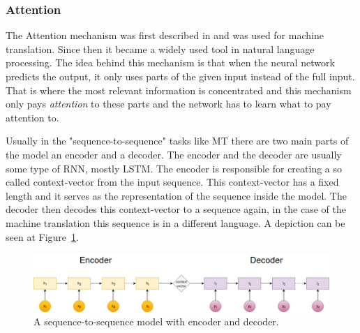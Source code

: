 \subsubsection{Attention}
The Attention mechanism was first described in \cite{Bahdanau:2015} and was used for machine translation. Since then it became a widely used tool in natural language processing. The idea behind this mechanism is that when the neural network predicts the output, it only uses parts of the given input instead of the full input. That is where the most relevant information is concentrated and this mechanism only pays \textit{attention} to these parts and the network has to learn what to pay attention to.

Usually in the "sequence-to-sequence" tasks like MT there are two main parts of the model an encoder and a decoder. The encoder and the decoder are usually some type of RNN, mostly LSTM. The encoder is responsible for creating a so called context-vector from the input sequence. This context-vector has a fixed length and it serves as the representation of the sequence inside the model. The decoder then decodes this context-vector to a sequence again, in the case of the machine translation this sequence is in a different language. A depiction can be seen at Figure~\ref{fig:seq_to_seq}.
\begin{figure}[!htb]
	\centering
	\includegraphics[scale=0.4]{figures/seq_to_seq.jpg}
	\caption{A sequence-to-sequence model with encoder and decoder.}
	\label{fig:seq_to_seq}
\end{figure}

